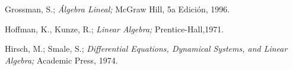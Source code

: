 \begin{thebibliography}{A}
	Grossman, S.;
	\emph{\'Algebra Lineal;}
	McGraw Hill, 5a Edici\'on, 1996.
	
	Hoffman, K., Kunze, R.;
	\emph{Linear Algebra;}
	Prentice-Hall,1971.
	
	Hirsch, M.; Smale, S.;
	\emph{Differential Equations, Dynamical Systems, and Linear Algebra;}
	Academic Press, 1974.
	
\end{thebibliography}